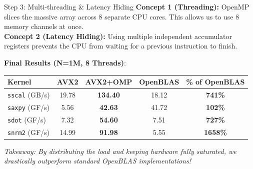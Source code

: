 \documentclass{beamer}
\begin{document}
\begin{frame}{Step 3: Multi-threading \& Latency Hiding}
    \textbf{Concept 1 (Threading):} OpenMP slices the massive array across 8 separate CPU cores. This allows us to use 8 memory channels at once.\\
    \textbf{Concept 2 (Latency Hiding):} Using multiple independent accumulator registers prevents the CPU from waiting for a previous instruction to finish.
    \vspace{0.3cm}
    
    \textbf{Final Results (N=1M, 8 Threads)}:
    \begin{table}[]
    \centering
    \begin{tabular}{@{}l|cc|c|c@{}}
    \toprule
    \textbf{Kernel} & \textbf{AVX2} & \textbf{AVX2+OMP} & \textbf{OpenBLAS} & \textbf{\% of OpenBLAS} \\ \midrule
    \texttt{sscal} (GB/s)   & 19.78         & \textbf{134.40}   & 18.12             & \textbf{741\%}          \\
    \texttt{saxpy} (GF/s)   & 5.56          & \textbf{42.63}    & 41.72             & \textbf{102\%}          \\
    \texttt{sdot} (GF/s)    & 7.32          & \textbf{54.60}    & 7.51              & \textbf{727\%}          \\
    \texttt{snrm2} (GF/s)   & 14.99         & \textbf{91.98}    & 5.55              & \textbf{1658\%}         \\ \bottomrule
    \end{tabular}
    \end{table}
    
    \textit{Takeaway: By distributing the load and keeping hardware fully saturated, we drastically outperform standard OpenBLAS implementations!}
\end{frame}
\end{document}
